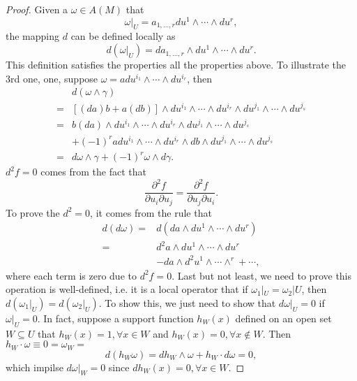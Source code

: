 \begin{proof}
Given a $\omega\in A(M)$ that
\begin{equation*}
\omega|_U = a_{1,\dots,r}du^{1}\wedge\cdots\wedge du^r,
\end{equation*}
the mapping $d$ can be defined locally as
\begin{equation}
d(\omega|_U)=da_{1,\dots,r}\wedge du^{1}\wedge\cdots\wedge du^r.
\end{equation}
This definition satisfies the properties all the properties above. To illustrate the 3rd one, one, suppose $\omega=adu^{i_1}\wedge\cdots\wedge du^{i_r}$, then
\begin{equation*}
\begin{aligned}
&d(\omega\wedge\gamma)\\
=&[(da)b+a(db)]\wedge du^{i_1}\wedge\cdots\wedge du^{i_r}\wedge du^{j_1}\wedge\cdots\wedge du^{j_s}\\
=&b(da)\wedge du^{i_1}\wedge\cdots\wedge du^{i_r}\wedge du^{j_1}\wedge\cdots\wedge du^{j_s}\\
&+(-1)^radu^{i_1}\wedge\cdots\wedge du^{i_r}\wedge db\wedge du^{j_1}\wedge\cdots\wedge du^{j_s}\\
=&d\omega\wedge\gamma+(-1)^r\omega\wedge d\gamma.
\end{aligned}
\end{equation*}
$d^2f=0$ comes from the fact that 
\begin{equation*}
\frac{\partial^2f}{\partial u_i \partial u_j}=\frac{\partial^2f}{\partial u_j \partial u_i}.
\end{equation*}
To prove the $d^2=0$, it comes from the rule that
\begin{equation*}
\begin{aligned}
d(d\omega) =& d(da\wedge du^1\wedge\cdots\wedge du^r)\\
=&d^2a\wedge du^1\wedge\cdots\wedge du^r\\
&-da\wedge d^2u^1\wedge\cdots\wedge^r+\cdots,
\end{aligned}
\end{equation*}
where each term is zero due to $d^2f=0$. Last but not least, we need to prove this operation is well-defined, i.e. it is a local operator that if $\omega_1|_U=\omega_2|U$, then $d(\omega_1|_U)=d(\omega_2|_U)$. To show this, we just need to show that $d\omega|_U=0$ if $\omega|_U=0$. In fact, suppose a support function $h_W(x)$ defined on an open set $W\subseteq U$ that $h_W(x)=1,\forall x\in W$ and $h_W(x)=0,\forall x\notin W$. Then $h_W\cdot\omega\equiv0=\omega_W=$
\begin{equation*}
d(h_W\omega)=dh_W\wedge \omega+h_W\cdot d\omega=0,
\end{equation*}
which impilse $d\omega|_W=0$ since $dh_W(x)=0,\forall x\in W$.
\end{proof}

